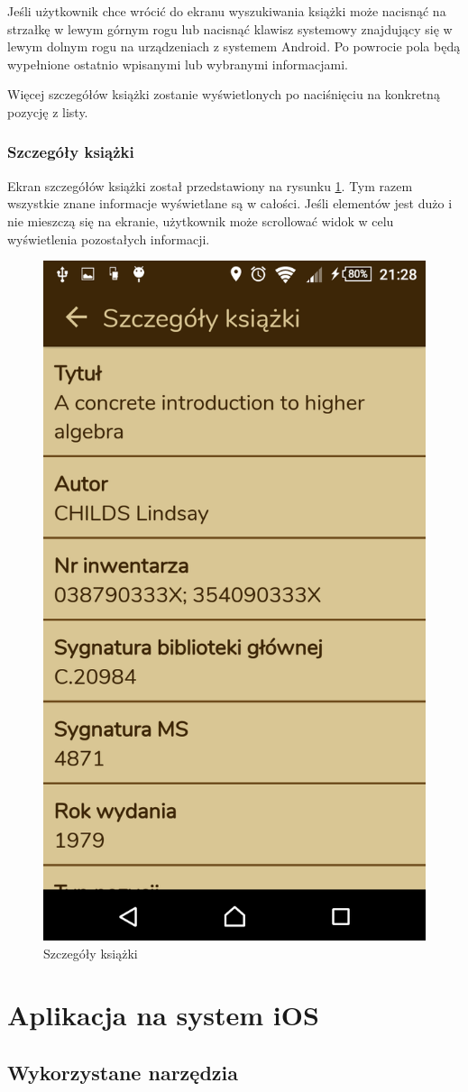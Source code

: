 \documentclass[twoside]{projektInzynierskiMS}
\begin{document}
Jeśli użytkownik chce wrócić do ekranu wyszukiwania książki może nacisnąć na strzałkę w lewym górnym rogu lub nacisnąć klawisz systemowy znajdujący się w lewym dolnym rogu na urządzeniach z systemem Android. Po powrocie pola będą wypełnione ostatnio wpisanymi lub wybranymi informacjami.

Więcej szczegółów książki zostanie wyświetlonych po naciśnięciu na konkretną pozycję z listy. 

\subsubsection{Szczegóły książki}

Ekran szczegółów książki został przedstawiony na rysunku \ref{fig:anroidBookDetails}. Tym razem wszystkie znane informacje wyświetlane są w całości. Jeśli elementów jest dużo i nie mieszczą się na ekranie, użytkownik może scrollować widok w celu wyświetlenia pozostałych informacji.

\begin{figure}[h]
  \centering
  \includegraphics[width=0.4\linewidth]{img/android/android8.PNG}
  \caption{Szczegóły książki}
  \label{fig:anroidBookDetails}
\end{figure}



\section{Aplikacja na system iOS}

\subsection{Wykorzystane narzędzia}
\end{document}
